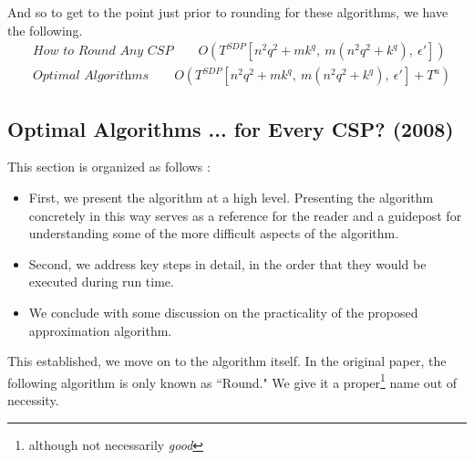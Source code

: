 \documentclass[letterpaper, 12pt]{article}
\numberwithin{equation}{section}
\begin{document}
And so to get to the point just prior to rounding for these algorithms, we have the following.
\begin{align}
&\textit{How to Round Any CSP} \qquad O( T^{SDP}\left[n^2q^2 + mk^q,~ m (n^2q^2 + k^q),~\epsilon'\right])  \\
&\textit{Optimal Algorithms} \qquad O( T^{SDP}\left[n^2q^2 + mk^q,~ m (n^2q^2 + k^q),~\epsilon'\right] + T^u)
\end{align} 


\subsection{Optimal Algorithms ... for Every CSP? (2008)}
This section is organized as follows :
\begin{itemize}
\item First, we present the algorithm at a high level. Presenting the algorithm concretely in this way serves as a reference for the reader and a guidepost for understanding some of the more difficult aspects of the algorithm.
\item Second, we address key steps in detail, in the order that they would be executed during run time.
\item We conclude with some discussion on the practicality of the proposed approximation algorithm.
\end{itemize}

This established, we move on to the algorithm itself. In the original paper, the following algorithm is only known as ``Round." We give it a proper\footnote{although not necessarily \textit{good}} name out of necessity.
\end{document}
